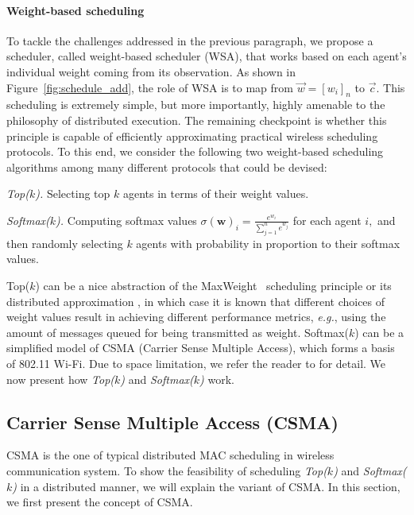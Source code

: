 \paragraph{Weight-based scheduling}
To tackle the challenges addressed in the previous paragraph, we
propose a scheduler, called weight-based scheduler (WSA), that works based on each agent's individual weight
coming from its observation. As
shown in Figure~\ref{fig:schedule_add}, the role of WSA is to map from
$\vec{w}=[w_i]_n$ to $\vec{c}.$ This scheduling is extremely simple,
but more importantly, highly amenable to the philosophy of distributed
execution. The remaining checkpoint is whether this principle is
capable of efficiently approximating practical wireless scheduling
protocols. To this end, we consider the following two weight-based
scheduling algorithms among many different protocols that could be
devised:
\begin{compactitem}[$\circ$]

\item {\em Top($k$).} Selecting top $k$ agents in terms of their weight values. 

\item {\em Softmax($k$).} Computing softmax values $\sigma({\bm w})_i = \frac{e^{w_i}}{\sum_{j=1}^{n}e^{w_j}}$ for each agent $i,$ and then randomly selecting  $k$ agents with probability in proportion to their softmax values. 
\end{compactitem}

Top($k$) can be a nice abstraction of
the MaxWeight~\citep{tassiulas1992stability} scheduling principle or its
distributed approximation \citep{yy_scheduling}, in which case it is
known that different choices of weight values result in achieving
different performance metrics, {\em e.g.}, using the amount of messages
queued for being transmitted as weight. Softmax($k$) can be a
simplified model of CSMA (Carrier Sense Multiple Access), which forms
a basis of 802.11 Wi-Fi.  Due to space limitation, we refer the reader
to \citet{jiang2010distributed} for detail. We now present how {\em
  Top($k$)} and {\em Softmax($k$)} work.
 

\subsection{Carrier Sense Multiple Access (CSMA)}
CSMA is the one of typical distributed MAC scheduling in wireless
communication system. To show the feasibility of scheduling {\em
  Top($k$)} and {\em Softmax($k$)} in a distributed manner, we will
explain the variant of CSMA. In this section, we first present the
concept of CSMA.

